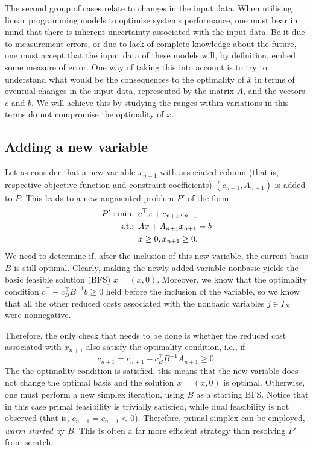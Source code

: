The second group of cases relate to changes in the input data. When utilising linear programming models to optimise systems performance, one must bear in mind that there is inherent uncertainty associated with the input data. Be it due to measurement errors, or due to lack of complete knowledge about the future, one must accept that the input data of these models will, by definition, embed some measure of error. One way of taking this into account is to try to understand what would be the consequences to the optimality of $\overline{x}$ in terms of eventual changes in the input data, represented by the matrix $A$, and the vectors $c$ and $b$. We will achieve this by studying the ranges within variations in this terms do not compromise the optimality of $\overline{x}$. 


\subsection{Adding a new variable} \label{section_611}

Let us consider that a new variable $x_{n+1}$ with associated column (that is, respective objective function and constraint coefficients) $(c_{n+1}, A_{n+1})$ is added to $P$. This leads to a new augmented problem $P'$ of the form
%
\begin{align*}
	P': \mathop{\text{min.~}} \, &c^\top x + c_{n+1}x_{n+1}\\
	\mathop{\text{s.t.:~}} \, & Ax + A_{n+1}x_{n+1}= b \\
	& x \geq 0, x_{n+1} \geq 0. 	
\end{align*}
%
We need to determine if, after the inclusion of this new variable, the current basis $B$ is still optimal. Clearly, making the newly added variable nonbasic yields the basic feasible solution (BFS) $x = (\overline{x}, 0)$. Moreover, we know that the optimality condition $c^\top - c_B^\top B^{-1}b \geq 0$ held before the inclusion of the variable, so we know that all the other reduced costs associated with the nonbasic variables $j \in I_N$ were nonnegative. 

Therefore, the only check that needs to be done is whether the reduced cost associated with $x_{n+1}$ also satisfy the optimality condition, i.e., if
%
\begin{equation*}
	\overline{c}_{n+1} = c_{n+1} - c_B^\top B^{-1}A_{n+1} \geq 0.	
\end{equation*}
%
The the optimality condition is satisfied, this means that the new variable does not change the optimal basis and the solution $x = (\overline{x}, 0)$ is optimal. Otherwise, one must perform a new simplex iteration, using $B$ as a starting BFS. Notice that in this case primal feasibility is trivially satisfied, while dual feasibility is not observed (that is, $\overline{c}_{n+1} = c_{n+1} < 0$). Therefore, primal simplex can be employed, \emph{warm started} by $B$. This is often a far more efficient strategy than resolving $P'$ from scratch.

